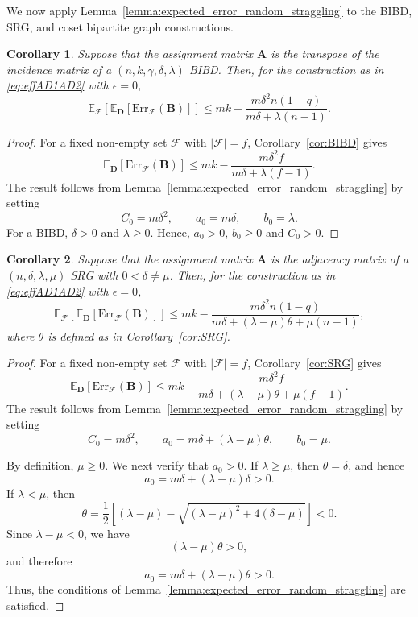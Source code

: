 \documentclass[journal,draftcls,onecolumn]{IEEEtran}
\theoremstyle{mystyle}
\newtheorem{cor}{Corollary}
\begin{document}
We now apply Lemma~\ref{lemma:expected_error_random_straggling} to the BIBD, SRG, and coset bipartite graph constructions.

\begin{cor}
\label{cor:expected_error_BIBD_strr}
Suppose that the assignment matrix $\mathbf{A}$ is the transpose of the incidence matrix of a $(n,k,\gamma,\delta,\lambda)$ BIBD. Then, for the construction as in \eqref{eq:effAD1AD2} with $\epsilon=0$,
\[
\mathbb{E}_{\mathcal{F}}
\left[
\mathbb{E}_{\mathbf{D}}
\left[
\text{Err}_{\mathcal{F}}(\mathbf{B})
\right]
\right]
\leq
mk-
\frac{m\delta^2n(1-q)}
{m\delta+\lambda(n-1)}.
\]
\end{cor}

\begin{proof}
For a fixed non-empty set $\mathcal{F}$ with $|\mathcal{F}|=f$, Corollary~\ref{cor:BIBD} gives
\[
\mathbb{E}_{\mathbf{D}}
\left[
\text{Err}_{\mathcal{F}}(\mathbf{B})
\right]
\leq
mk-
\frac{m\delta^2f}
{m\delta+\lambda(f-1)}.
\]
The result follows from Lemma~\ref{lemma:expected_error_random_straggling} by setting
\[
C_0=m\delta^2,
\qquad
a_0=m\delta,
\qquad
b_0=\lambda.
\]
For a BIBD, $\delta>0$ and $\lambda\geq0$. Hence, $a_0>0$, $b_0\geq0$ and $C_0 > 0$.
\end{proof}

\begin{cor}
\label{cor:expected_error_SRG_strr}
Suppose that the assignment matrix $\mathbf{A}$ is the adjacency matrix of a $(n,\delta,\lambda,\mu)$ SRG with $0<\delta\neq\mu$. Then, for the construction as in \eqref{eq:effAD1AD2} with $\epsilon=0$,
\[
\mathbb{E}_{\mathcal{F}}
\left[
\mathbb{E}_{\mathbf{D}}
\left[
\text{Err}_{\mathcal{F}}(\mathbf{B})
\right]
\right]
\leq
mk-
\frac{m\delta^2n(1-q)}
{m\delta+(\lambda-\mu)\theta+\mu(n-1)},
\]
where $\theta$ is defined as in Corollary~\ref{cor:SRG}.
\end{cor}

\begin{proof}
For a fixed non-empty set $\mathcal{F}$ with $|\mathcal{F}|=f$, Corollary~\ref{cor:SRG} gives
\[
\mathbb{E}_{\mathbf{D}}
\left[
\text{Err}_{\mathcal{F}}(\mathbf{B})
\right]
\leq
mk-
\frac{m\delta^2f}
{m\delta+(\lambda-\mu)\theta+\mu(f-1)}.
\]
The result follows from Lemma~\ref{lemma:expected_error_random_straggling} by setting
\[
C_0=m\delta^2,
\qquad
a_0=m\delta+(\lambda-\mu)\theta,
\qquad
b_0=\mu.
\]

By definition, $\mu\geq0$. We next verify that $a_0>0$. If $\lambda\geq\mu$, then $\theta=\delta$, and hence
\[
a_0
=
m\delta+(\lambda-\mu)\delta
>0.
\]
If $\lambda<\mu$, then
\[
\theta
=
\frac{1}{2}
\left[
(\lambda-\mu)
-
\sqrt{(\lambda-\mu)^2+4(\delta-\mu)}
\right]
<0.
\]
Since $\lambda-\mu<0$, we have
\[
(\lambda-\mu)\theta>0,
\]
and therefore
\[
a_0=m\delta+(\lambda-\mu)\theta>0.
\]
Thus, the conditions of Lemma~\ref{lemma:expected_error_random_straggling} are satisfied.
\end{proof}
\end{document}
